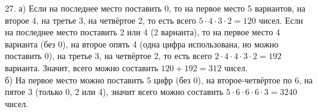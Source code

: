 27. а) Если на последнее место поставить 0, то на первое место 5 вариантов, на второе 4, на третье 3, на четвёртое 2, то есть всего $5\cdot4\cdot3\cdot2=120$ чисел. Если на последнее место поставить 2 или 4 (2 варианта), то на первое место 4 варианта (без 0), на второе опять 4 (одна цифра использована, но можно поставить 0), на третье 3, на четвёртое 2, то есть всего $2\cdot4\cdot4\cdot3\cdot2=192$ варианта. Значит, всего можно составить $120+192=312$ чисел.\\
б) На первое место можно поставить 5 цифр (без 0), на второе-четвёртое по 6, на пятое 3 (только 0, 2 или 4), значит всего можно составить $5\cdot6\cdot6\cdot6\cdot3=3240$ чисел.\\
